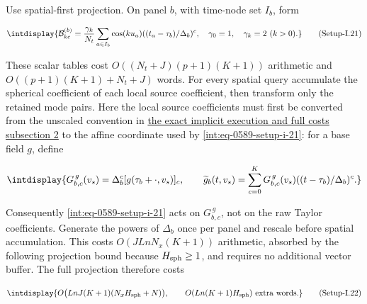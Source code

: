 
Use spatial-first projection. On panel \(b\), with time-node set \(I_b\), form


\label{int:eq-setup-i-21}
\begingroup\renewcommand{\theHequation}{intdisplay.1104}
\begin{equation}
\intdisplay{
\mathcal B_{kc}^{(b)}
=\frac{\gamma_k}{N_t}\sum_{a\in I_b}
\cos(ku_a)((t_a-\tau_b)/\Delta_b)^c,
\quad \gamma_0=1,\quad\gamma_k=2\ (k>0).
}
\tag{Setup-I.21}
\label{int:eq-0589-setup-i-21}
\end{equation}
\endgroup


These scalar tables cost \(O((N_t+J)(p+1)(K+1))\) arithmetic and \(O((p+1)(K+1)+N_t+J)\) words. For every spatial query accumulate the spherical coefficient of each local source coefficient, then transform only the retained mode pairs. Here the local source coefficients must first be converted from the unscaled convention in \hyperref[int:setup-implicit-2]{the exact implicit execution and full costs subsection 2} to the affine coordinate used by \hyperref[int:eq-setup-i-21]{\eqref{int:eq-0589-setup-i-21}}: for a base field \(g\), define


\begingroup\renewcommand{\theHequation}{intdisplay.1105}
\begin{equation*}
\intdisplay{
G_{b,c}^{\,g}(v_s)=\Delta_b^c[g(\tau_b+\cdot,v_s)]_c,
\qquad
\widetilde g_b(t,v_s)=\sum_{c=0}^K G_{b,c}^{\,g}(v_s)
                 ((t-\tau_b)/\Delta_b)^c.
}
\end{equation*}
\endgroup


Consequently \hyperref[int:eq-setup-i-21]{\eqref{int:eq-0589-setup-i-21}} acts on \(G_{b,\allowbreak c}^{\,\allowbreak g}\), not on the raw Taylor coefficients. Generate the powers of \(\Delta_b\) once per panel and rescale before spatial accumulation. This costs \(O(JLnN_x(K+1))\) arithmetic, absorbed by the following projection bound because \(H_{\rm sph}\ge1\), and requires no additional vector buffer. The full projection therefore costs


\label{int:eq-setup-i-22}
\begingroup\renewcommand{\theHequation}{intdisplay.1106}
\begin{equation}
\intdisplay{
O\bigl(LnJ(K+1)(N_xH_{\rm sph}+N)\bigr),\qquad
O(Ln(K+1)H_{\rm sph})\ \text{extra words}.
}
\tag{Setup-I.22}
\label{int:eq-0590-setup-i-22}
\end{equation}
\endgroup

